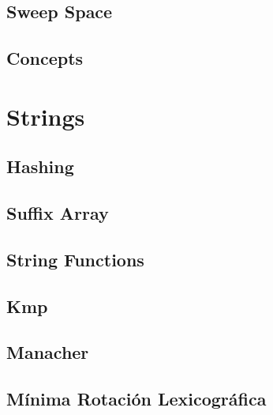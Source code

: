 \documentclass[a4paper,11pt,landscape,twocolumn]{article}
\begin{document}


\subsection{Sweep Space}



\subsection{Concepts}



\section{Strings}

\subsection{Hashing}



\subsection{Suffix Array}



\subsection{String Functions}



\subsection{Kmp}



\subsection{Manacher}



\subsection{Mínima Rotación Lexicográfica}
\end{document}

